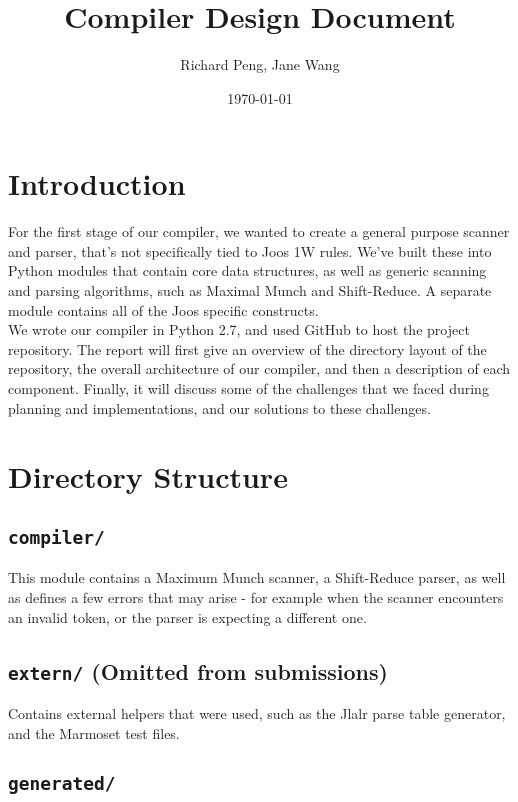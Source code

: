 \documentclass[12pt, a4paper]{article}
\title{Compiler Design Document}
\date{\today}
\author{Richard Peng, Jane Wang}
\begin{document}
\maketitle

\section{Introduction}

For the first stage of our compiler, we wanted to create a general purpose scanner and parser, that's not specifically tied to Joos 1W rules. We've built these into Python modules that contain core data structures, as well as generic scanning and parsing algorithms, such as Maximal Munch and Shift-Reduce. A separate module contains all of the Joos specific constructs. \\

We wrote our compiler in Python 2.7, and used GitHub to host the project repository. The report will first give an overview of the directory layout of the repository, the overall architecture of our compiler, and then a description of each component. Finally, it will discuss some of the challenges that we faced during planning and implementations, and our solutions to these challenges.

\section{Directory Structure}

\subsection{\texttt{compiler/}}

This module contains a Maximum Munch scanner, a Shift-Reduce parser, as well as defines a few errors that may arise - for example when the scanner encounters an invalid token, or the parser is expecting a different one.

\subsection{\texttt{extern/} (Omitted from submissions)}

Contains external helpers that were used, such as the Jlalr parse table generator, and the Marmoset test files.
 
\subsection{\texttt{generated/}}
\end{document}
